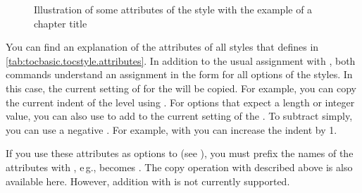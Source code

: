 \begin{description}
\begin{figure}
{%
    }
    \caption{Illustration of some attributes of the 
      style with the example of a chapter title}%
    \label{fig:tocbasic.undottedtocline}
  \end{figure}
\end{description}
You can find an explanation of the attributes of all styles that
 defines in \autoref{tab:tocbasic.tocstyle.attributes}.
In addition to the usual assignment with
, both commands understand an assignment in 
the form  for all options of the
\KOMAScript{} styles. In this case, the current setting of  for the
 will be copied. For example, you can copy the current
indent of the  level using . For
options that expect a length or integer value, you can also use
 to add to the current setting
of the . To subtract simply, you can use a negative .
For example, with  you can increase the indent by
1.

If you use these attributes as
options to  (see
), you must prefix the names of the
attributes with , e\,g.,  becomes
. The copy operation with \Option{:=} described above is
also available here. However, addition with \Option{+=} is not currently
supported.

